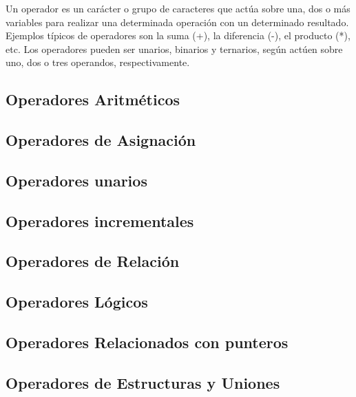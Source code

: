 Un operador es un carácter o grupo de caracteres que actúa sobre una, dos o más variables
para realizar una determinada operación con un determinado resultado. Ejemplos típicos de
operadores son la suma (+), la diferencia (-), el producto (*), etc. Los operadores pueden ser
unarios, binarios y ternarios, según actúen sobre uno, dos o tres operandos, respectivamente.

\subsection{Operadores Aritméticos}


\subsection{Operadores de Asignación}


\subsection{Operadores unarios}


\subsection{Operadores incrementales}


\subsection{Operadores de Relación}


\subsection{Operadores Lógicos}


\subsection{Operadores Relacionados con punteros}


\subsection{Operadores de Estructuras y Uniones}


